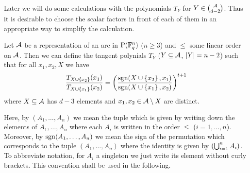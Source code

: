 Later we will do some calculations with the polynomials $T_Y$ for $Y\in\binom{\cA}{d-2}$. Thus it is desirable to choose the scalar factors in front of each of them in an appropriate way to simplify the calculation.
\begin{corollary}\label{mds-segre-simplified}
    Let $\mathcal{A}$ be a representation of an arc in $\P(\field{q}^n)$ ($n\geq 3$) and $\leq$ some linear
    order on $\mathcal{A}$. Then we can define the tangent polynials $T_Y$
    ($Y\subseteq \mathcal{A}$, $\left|Y\right|=n-2$) such that for all $x_1,x_2,X$ we have
    $$    \frac{T_{X\setjoin\set{x_2}}(x_1)}{T_{X\setjoin\set{x_1}}(x_2)}={\left(\frac{\sgn(X\setjoin\set{x_2},x_1)}{\sgn(X\setjoin\set{x_1},x_2)}\right)}^{t+1}
    $$
    where $X\subseteq \mathcal{A}$ has $d-3$ elements and $x_1,x_2\in \mathcal{A}\setminus X$ are distinct.
\end{corollary}

\begin{remark}
    Here, by $(A_1,\ldots,A_n)$ we mean the tuple
    which is given by writing down the elements of $A_1,\ldots,A_n$
    where each $A_i$ is written in the order $\leq$
    ($i=1,\ldots,n$). Moreover, by $\mathop\mathrm{sgn}(A_1,\ldots,A_n)$ we mean
    the sign of the permutation which corresponds to the tuple $(A_1,\ldots,A_n)$
    where the identity is given by $(\bigcup_{i=1}^n{A_i})$. To abbreviate notation, for $A_i$ a singleton we just write its
    element without curly brackets.  
    This convention shall be used in the following.
\end{remark}

